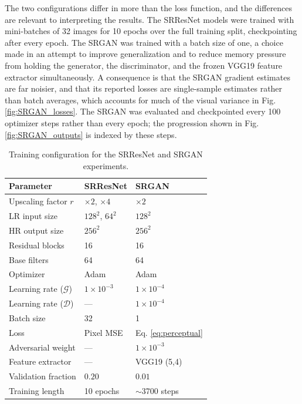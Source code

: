 \documentclass[conference]{IEEEtran}
\begin{document}
The two configurations differ in more than the loss function, and the differences are relevant to interpreting the results. The SRResNet models were trained with mini-batches of 32 images for 10 epochs over the full training split, checkpointing after every epoch. The SRGAN was trained with a batch size of one, a choice made in an attempt to improve generalization and to reduce memory pressure from holding the generator, the discriminator, and the frozen VGG19 feature extractor simultaneously. A consequence is that the SRGAN gradient estimates are far noisier, and that its reported losses are single-sample estimates rather than batch averages, which accounts for much of the visual variance in Fig. \ref{fig:SRGAN_losses}. The SRGAN was evaluated and checkpointed every 100 optimizer steps rather than every epoch; the progression shown in Fig. \ref{fig:SRGAN_outputs} is indexed by these steps.

\begin{table}[t]
\centering
\caption{Training configuration for the SRResNet and SRGAN experiments.}
\label{tab:hyperparams}
\renewcommand{\arraystretch}{1.15}
\begin{tabular}{@{}lll@{}}
\hline
\textbf{Parameter} & \textbf{SRResNet} & \textbf{SRGAN} \\
\hline
Upscaling factor $r$        & $\times 2$, $\times 4$      & $\times 2$ \\
LR input size               & $128^2$, $64^2$             & $128^2$ \\
HR output size              & $256^2$                     & $256^2$ \\
Residual blocks             & 16                          & 16 \\
Base filters                & 64                          & 64 \\
Optimizer                   & Adam                        & Adam \\
Learning rate ($\mathcal{G}$) & $1 \times 10^{-3}$        & $1 \times 10^{-4}$ \\
Learning rate ($\mathcal{D}$) & ---                       & $1 \times 10^{-4}$ \\
Batch size                  & 32                          & 1 \\
Loss                        & Pixel MSE                   & Eq. \eqref{eq:perceptual} \\
Adversarial weight          & ---                         & $1 \times 10^{-3}$ \\
Feature extractor           & ---                         & VGG19 (5,4) \\
Validation fraction         & $0.20$                      & $0.01$ \\
Training length             & 10 epochs                   & $\sim$3700 steps \\
\hline
\end{tabular}
\end{table}
\end{document}
